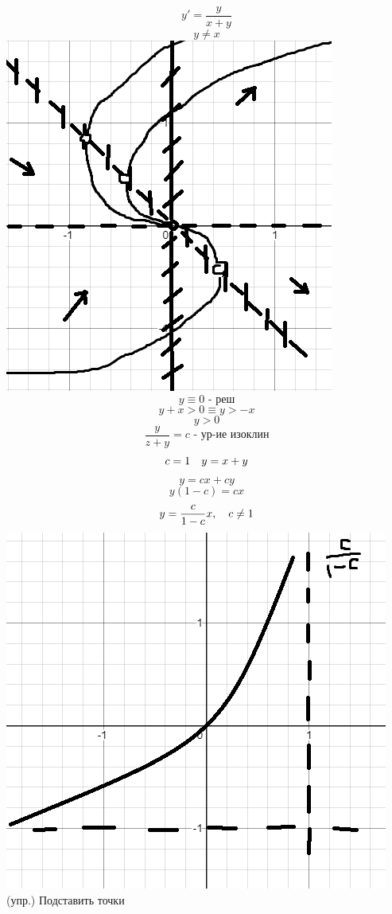 \documentclass[12pt, fleqn]{article}
\begin{document}
\begin{Example}
    \[y'=\frac{y}{x+y}\]
    \[y \neq x\]
    \includegraphics[scale=0.3]{pics/resh3.png}\\
    \[y \equiv 0\text{ - реш}\]
    \[y+x>0 \equiv y>-x\]
    \[y>0\]
    \[\frac{y}{z+y}=c \text{ - ур-ие изоклин}\]
    \[c=1 \quad y=x+y\]
    \[y=cx+cy\]
    \[y(1-c)=cx\]
    \[y=\frac{c}{1-c}x,\quad c \neq 1\]
    \includegraphics[scale=0.3]{pics/resh4.png}\\
    (упр.) Подставить точки
\end{Example}
\end{document}
